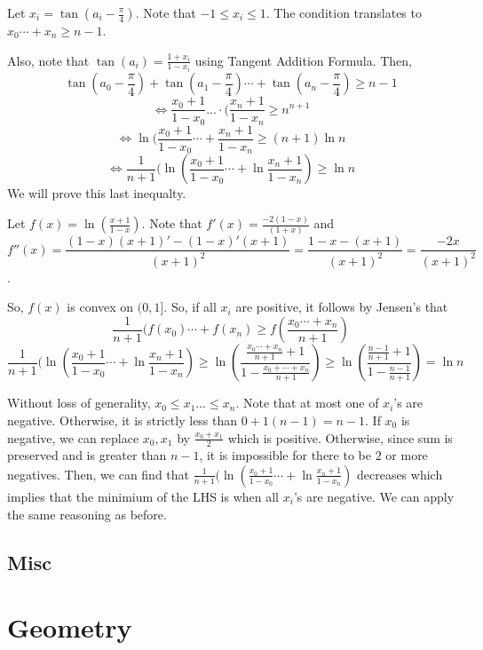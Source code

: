 \documentclass[11pt]{article}
\begin{document}
\begin{sol}
Let $x_{i}=\tan(a_{i}-\frac{\pi}{4})$. Note that $-1\leq x_{i}\leq 1$. The condition translates to $x_{0}\cdots + x_{n} \ge n-1$. 

Also, note that $\tan(a_{i}) = \frac{1+x_{i}}{1-x_{i}}$ using Tangent Addition Formula. Then, 
$$\tan(a_{0}-\frac{\pi}{4})+\tan(a_{1}-\frac{\pi}{4}) \cdots + \tan(a_{n}-\frac{\pi}{4}) \ge n-1$$
$$\iff \frac{x_{0}+1}{1-x_{0}}... \cdot (\frac{x_{n}+1}{1-x_{n}} \ge n^{n+1}$$
$$\iff \ln (\frac{x_{0}+1}{1-x_{0}}\cdots + \frac{x_{n}+1}{1-x_{n}} \ge (n+1) \ln n$$
$$\iff \frac{1}{n+1}(\ln (\frac{x_{0}+1}{1-x_{0}}\cdots + \ln \frac{x_{n}+1}{1-x_{n}}) \ge \ln n$$
We will prove this last inequalty.

Let $f(x) = \ln(\frac{x+1}{1-x})$. Note that $f'(x) = \frac{-2(1-x)}{(1+x)}$ and 
$$f''(x)=\frac{(1-x)(x+1)'-(1-x)'(x+1)}{(x+1)^2} = \frac{1-x -(x+1)}{(x+1)^2} = \frac{-2x}{(x+1)^2}$$. 

So, $f(x)$ is convex on $(0,1]$. So, if all $x_{i}$ are positive, it follows by Jensen's that 
$$\frac{1}{n+1} (f(x_{0}) \cdots + f(x_{n}) \ge f(\frac{x_{0}\cdots +x_{n}}{n+1})$$
$$\frac{1}{n+1}(\ln (\frac{x_{0}+1}{1-x_{0}}\cdots + \ln \frac{x_{n}+1}{1-x_{n}}) \ge \ln(\frac{\frac{x_{0}\cdots +x_{n}}{n+1}+1}{1-\frac{x_{0}+\cdots + x_{n}}{n+1}}) \ge \ln(\frac{\frac{n-1}{n+1}+1}{1-\frac{n-1}{n+1}})= \ln n$$

Without loss of generality, $x_{0}\leq x_{1} \ldots \leq x_{n}$. Note that at most one of $x_{i}$'s are negative. Otherwise, it is strictly less than $0+1(n-1)=n-1$. If $x_{0}$ is negative, we can replace $x_{0},x_{1}$ by $\frac{x_{0}+x_{1}}{2}$ which is positive. Otherwise, since sum is preserved and is greater than $n-1$, it is impossible for there to be $2$ or more negatives. Then, we can find that $\frac{1}{n+1}(\ln (\frac{x_{0}+1}{1-x_{0}}\cdots + \ln \frac{x_{n}+1}{1-x_{n}})$ decreases which implies that the minimium of the LHS is when all $x_{i}$'s are negative. We can apply the same reasoning as before.
\end{sol}


\subsection{Misc}


\setcounter{problem}{0}
\section{Geometry}
\end{document}
